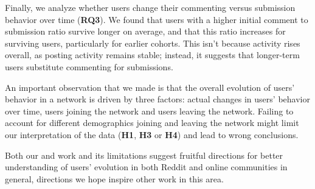Finally, we analyze whether users change their commenting versus submission behavior over time (\textbf{RQ3}). 
We found that users with a higher initial comment to submission ratio survive longer on average, and that this ratio increases for surviving users, particularly for earlier cohorts.  This isn't because activity rises overall, as posting activity remains stable; instead, it suggests that longer-term users substitute commenting for submissions. 

An important observation that we made is that the overall evolution of users' behavior in a network is driven by three factors: actual changes in users' behavior over time, users joining the network and users leaving the network. Failing to account for different demographics joining and leaving the network might limit our interpretation of the data (\textbf{H1}, \textbf{H3} or \textbf{H4}) and lead to wrong conclusions.

Both our and work and its limitations suggest fruitful directions for better understanding of users' evolution in both Reddit and online communities in general, directions we hope inspire other work in this area.  
